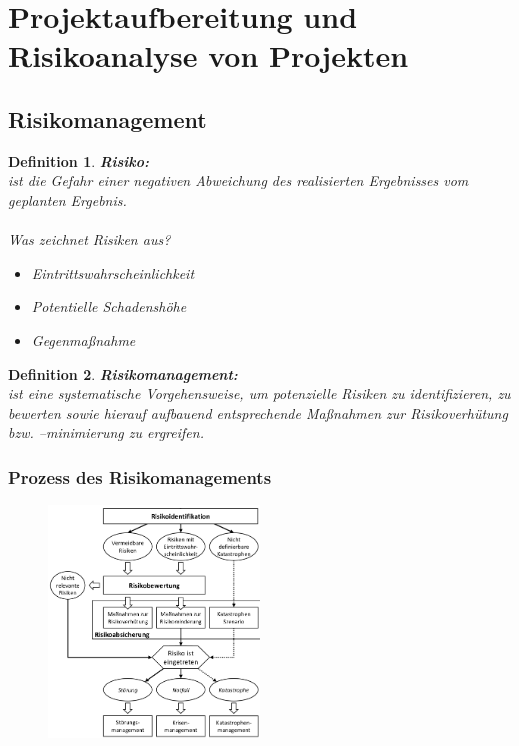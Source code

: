 \documentclass[11pt,a4paper]{article}
\newenvironment{de}[1]
{\begin{mdframed}[style=de]\begin{mydef}{\textbf{#1:}}\\} 
{\end{mydef}\end{mdframed}}
\newtheorem{mydef}{Definition}
\begin{document}
\section{Projektaufbereitung und Risikoanalyse von Projekten}

\subsection{Risikomanagement}
\begin{de}{Risiko}
ist die Gefahr einer negativen Abweichung des
realisierten Ergebnisses vom geplanten Ergebnis.\\
\\
Was zeichnet Risiken aus?
\begin{itemize}
\item Eintrittswahrscheinlichkeit
\item Potentielle Schadenshöhe
\item Gegenmaßnahme
\end{itemize}
\end{de}

\begin{de}{Risikomanagement}
ist eine systematische Vorgehensweise, um
potenzielle Risiken zu identifizieren, zu bewerten sowie hierauf aufbauend
entsprechende Maßnahmen zur Risikoverhütung bzw. –minimierung zu
ergreifen.
\end{de}

\subsubsection{Prozess des Risikomanagements}
\begin{figure}[H]
	\centering
	\includegraphics[width=0.5\textwidth]{ch12/prozess}
\end{figure}
\end{document}
